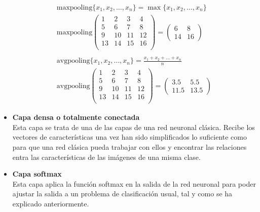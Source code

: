 \begin{itemize}
				$$
				\begin{gathered}
					\text{maxpooling}\{x_1, x_2, \hdots, x_n\} = \max\{x_1, x_2, \hdots, x_n\}\\
					\text{maxpooling}\left(\begin{array}{cc|cc}
						1 & 2 & 3 & 4\\
						5 & \boxed{6} & 7 & \boxed{8}\\\hline
						9 & 10 & 11 & 12\\
						13 & \boxed{14} & 15 & \boxed{16}\\
					\end{array}\right) = \begin{pmatrix}
						6 & 8\\
						14 & 16
					\end{pmatrix}\\\\
					\text{avgpooling}\{x_1, x_2, \hdots, x_n\} = \frac{x_1 + x_2 + \hdots + x_n}{n}\\
					\text{avgpooling}\left(\begin{array}{cc|cc}
						1 & 2 & 3 & 4\\
						5 & 6 & 7 & 8\\\hline
						9 & 10 & 11 & 12\\
						13 & 14 & 15 & 16\\
					\end{array}\right) = \begin{pmatrix}
						3.5 & 5.5\\
						11.5 & 13.5
					\end{pmatrix}
				\end{gathered}
				$$
				
				\item \textbf{Capa densa o totalmente conectada}\\
				Esta capa se trata de una de las capas de una red neuronal clásica. Recibe los vectores de características una vez han sido simplificados lo suficiente como para que una red clásica pueda trabajar con ellos y encontrar las relaciones entra las características de las imágenes de una misma clase. 
				
				\item \textbf{Capa softmax}\\
				Esta capa aplica la función softmax en la salida de la red neuronal para poder ajustar la salida a un problema de clasificación usual, tal y como se ha explicado anteriormente. 
			\end{itemize}
			
